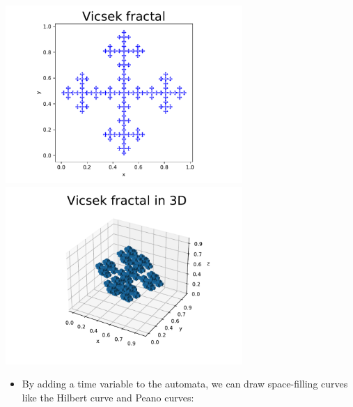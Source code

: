 \documentclass[landscape,usenames,dvipsnames, 25pt]{sciposter}
\begin{document}
\begin{multicols}{3}
\begin{center}
    \includegraphics[width=9cm]{FA20/images/fractals/vicsek-l5.pdf}
    \includegraphics[width=9cm]{FA20/images/fractals/vicsek-3d-l3.pdf}
\end{center}
    
\begin{itemize}
        \item By adding a time variable to the automata, we can draw space-filling curves like the Hilbert curve and Peano curves:
\end{itemize}
    

\end{multicols}
\end{document}

